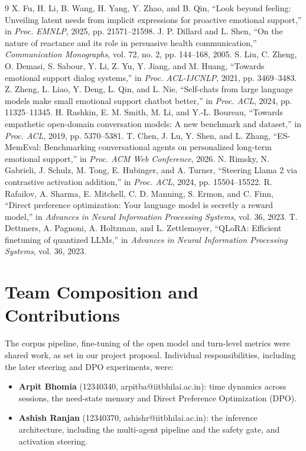 \documentclass[journal]{IEEEtran}
\begin{document}
\begin{thebibliography}{9}\footnotesize
{} X. Fu, H. Li, B. Wang, H. Yang, Y. Zhao, and B. Qin, ``Look beyond feeling: Unveiling latent needs from implicit expressions for proactive emotional support,'' in \emph{Proc. EMNLP}, 2025, pp. 21571--21598.
 J. P. Dillard and L. Shen, ``On the nature of reactance and its role in persuasive health communication,'' \emph{Communication Monographs}, vol. 72, no. 2, pp. 144--168, 2005.
 S. Liu, C. Zheng, O. Demasi, S. Sabour, Y. Li, Z. Yu, Y. Jiang, and M. Huang, ``Towards emotional support dialog systems,'' in \emph{Proc. ACL-IJCNLP}, 2021, pp. 3469--3483.
 Z. Zheng, L. Liao, Y. Deng, L. Qin, and L. Nie, ``Self-chats from large language models make small emotional support chatbot better,'' in \emph{Proc. ACL}, 2024, pp. 11325--11345.
 H. Rashkin, E. M. Smith, M. Li, and Y.-L. Boureau, ``Towards empathetic open-domain conversation models: A new benchmark and dataset,'' in \emph{Proc. ACL}, 2019, pp. 5370--5381.
 T. Chen, J. Lu, Y. Shen, and L. Zhang, ``ES-MemEval: Benchmarking conversational agents on personalized long-term emotional support,'' in \emph{Proc. ACM Web Conference}, 2026.
 N. Rimsky, N. Gabrieli, J. Schulz, M. Tong, E. Hubinger, and A. Turner, ``Steering Llama 2 via contrastive activation addition,'' in \emph{Proc. ACL}, 2024, pp. 15504--15522.
 R. Rafailov, A. Sharma, E. Mitchell, C. D. Manning, S. Ermon, and C. Finn, ``Direct preference optimization: Your language model is secretly a reward model,'' in \emph{Advances in Neural Information Processing Systems}, vol. 36, 2023.
 T. Dettmers, A. Pagnoni, A. Holtzman, and L. Zettlemoyer, ``QLoRA: Efficient finetuning of quantized LLMs,'' in \emph{Advances in Neural Information Processing Systems}, vol. 36, 2023.
\end{thebibliography}

\appendices
\section{Team Composition and Contributions}
The corpus pipeline, fine-tuning of the open model and turn-level metrics were shared work, as set in our project proposal. Individual responsibilities, including the later steering and DPO experiments, were:
\begin{itemize}
\item \textbf{Arpit Bhomia} (12340340, arpitba@iitbhilai.ac.in): time dynamics across sessions, the need-state memory and Direct Preference Optimization (DPO).
\item \textbf{Ashish Ranjan} (12340370, ashishr@iitbhilai.ac.in): the inference architecture, including the multi-agent pipeline and the safety gate, and activation steering.
\end{itemize}
\end{document}
